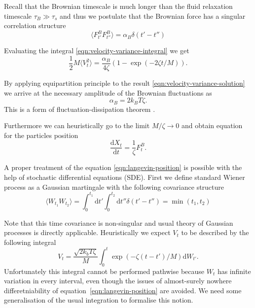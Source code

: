 \documentclass{doctoral}
\newcommand{\dd}{\mathrm{d}}
\begin{document}
Recall that the Brownian timescale is much longer than the fluid relaxation timescale $\tau_B \gg \tau_s$ and thus we postulate that the Brownian force has a singular correlation structure
\begin{equation}
    \langle F_{t'}^B F_{t''}^B \rangle = \alpha_B \delta(t'-t'') \label{eqn:white-noise-langevin}
\end{equation}

Evaluating the integral \eqref{eqn:velocity-variance-integral} we get
\begin{equation}
    \frac{1}{2} M \langle V_t^2 \rangle = \frac{\alpha_B}{4 \zeta} (1 - \exp(-2\zeta t / M)).
    \label{eqn:velocity-variance-solution}
\end{equation}

By applying equipartition principle to the result \eqref{eqn:velocity-variance-solution} we arrive at the necessary amplitude of the Brownian fluctuations as
\begin{equation}
    \alpha_B = 2 k_B T \zeta.
    \label{eqn:fluctuation-dissipation-raighley-particle}
\end{equation}
This is a form of fluctuation-dissipation theorem \cite{van_Kampen_1984,Ottinger_2012}.

Furthermore we can heuristically go to the limit $M/\zeta \to 0$ and obtain equation for the particles position
\begin{equation}
    \frac{\dd X_t}{\dd t} = \frac{1}{\zeta} F_t^B.
    \label{eqn:langevin-position}
\end{equation}

A proper treatment of the equation \eqref{eqn:langevin-position} is possible with the help of stochastic differential equations (SDE).
First we define standard Wiener process as a Gaussian martingale with the following covariance structure
\begin{equation}
    \langle W_{t_1} W_{t_2} \rangle = \int_0^{t_1} \dd t' \int_0^{t_2} \dd t'' \delta(t' - t'') = \min(t_1, t_2) \label{eqn:wiener-process-definition}
\end{equation}

Note that this time covariance is non-singular and usual theory of Gaussian processes is directly applicable.
Heuristically we expect $V_t$ to be described by the following integral
\begin{equation}
    V_t = \frac{\sqrt{2 k_b T \zeta}}{M} \int_0^t \exp\left( -\zeta(t - t')/M \right) \dd W_{t'}.
    \label{eqn:velocity-integral-sde}
\end{equation}
Unfortunately this integral cannot be performed pathwise because $W_t$ has infinite variation in every interval, even though the issues of almost-surely nowhere differetniability of equation~\eqref{eqn:langevin-position} are avoided.
We need some generalisation of the usual integration to formalise this notion.
\end{document}
